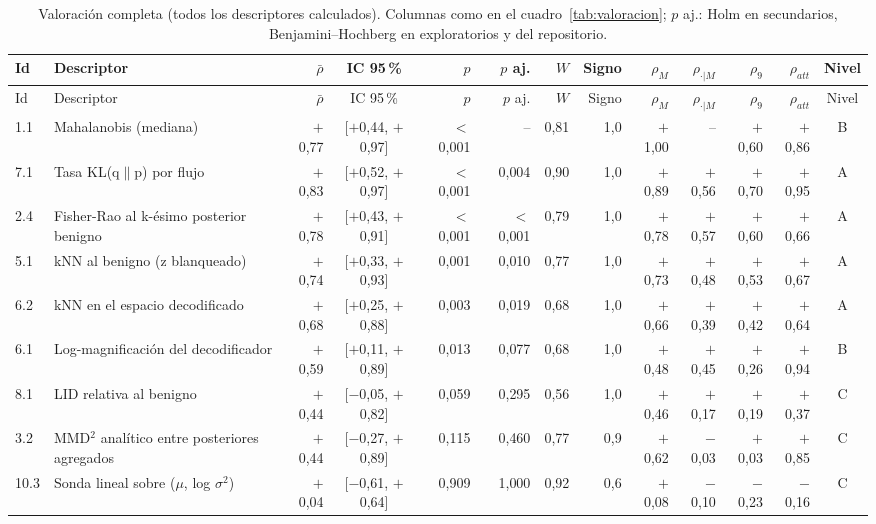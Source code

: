 \begin{longtable}{@{}l>{\raggedright\arraybackslash}p{3.6cm}rcrrrrrrrrc@{}}
\caption{Valoración completa (todos los descriptores calculados). Columnas como en el cuadro~\ref{tab:valoracion}; $p$ aj.: Holm en secundarios, Benjamini--Hochberg en exploratorios y del repositorio.}\label{tab:valoracion-completa}\\
\toprule
Id & Descriptor & $\bar\rho$ & IC 95\,\% & $p$ & $p$ aj. & $W$ & Signo & $\rho_{M}$ & $\rho_{\cdot|M}$ & $\rho_{9}$ & $\rho_{att}$ & Nivel \\
\midrule
\endfirsthead
\toprule
Id & Descriptor & $\bar\rho$ & IC 95\,\% & $p$ & $p$ aj. & $W$ & Signo & $\rho_{M}$ & $\rho_{\cdot|M}$ & $\rho_{9}$ & $\rho_{att}$ & Nivel \\
\midrule
\endhead
1.1 & Mahalanobis (mediana) & $+$0{,}77 & [$+$0{,}44, $+$0{,}97] & $<$0{,}001 & -- & 0{,}81 & 1{,}0 & $+$1{,}00 & -- & $+$0{,}60 & $+$0{,}86 & B \\
7.1 & Tasa KL(q$\|$p) por flujo & $+$0{,}83 & [$+$0{,}52, $+$0{,}97] & $<$0{,}001 & 0{,}004 & 0{,}90 & 1{,}0 & $+$0{,}89 & $+$0{,}56 & $+$0{,}70 & $+$0{,}95 & A \\
2.4 & Fisher-Rao al k-ésimo posterior benigno & $+$0{,}78 & [$+$0{,}43, $+$0{,}91] & $<$0{,}001 & $<$0{,}001 & 0{,}79 & 1{,}0 & $+$0{,}78 & $+$0{,}57 & $+$0{,}60 & $+$0{,}66 & A \\
5.1 & kNN al benigno (z blanqueado) & $+$0{,}74 & [$+$0{,}33, $+$0{,}93] & 0{,}001 & 0{,}010 & 0{,}77 & 1{,}0 & $+$0{,}73 & $+$0{,}48 & $+$0{,}53 & $+$0{,}67 & A \\
6.2 & kNN en el espacio decodificado & $+$0{,}68 & [$+$0{,}25, $+$0{,}88] & 0{,}003 & 0{,}019 & 0{,}68 & 1{,}0 & $+$0{,}66 & $+$0{,}39 & $+$0{,}42 & $+$0{,}64 & A \\
6.1 & Log-magnificación del decodificador & $+$0{,}59 & [$+$0{,}11, $+$0{,}89] & 0{,}013 & 0{,}077 & 0{,}68 & 1{,}0 & $+$0{,}48 & $+$0{,}45 & $+$0{,}26 & $+$0{,}94 & B \\
8.1 & LID relativa al benigno & $+$0{,}44 & [$-$0{,}05, $+$0{,}82] & 0{,}059 & 0{,}295 & 0{,}56 & 1{,}0 & $+$0{,}46 & $+$0{,}17 & $+$0{,}19 & $+$0{,}37 & C \\
3.2 & MMD$^2$ analítico entre posteriores agregados & $+$0{,}44 & [$-$0{,}27, $+$0{,}89] & 0{,}115 & 0{,}460 & 0{,}77 & 0{,}9 & $+$0{,}62 & $-$0{,}03 & $+$0{,}03 & $+$0{,}85 & C \\
10.3 & Sonda lineal sobre ($\mu$, log $\sigma^2$) & $+$0{,}04 & [$-$0{,}61, $+$0{,}64] & 0{,}909 & 1{,}000 & 0{,}92 & 0{,}6 & $+$0{,}08 & $-$0{,}10 & $-$0{,}23 & $-$0{,}16 & C \\

\end{longtable}
